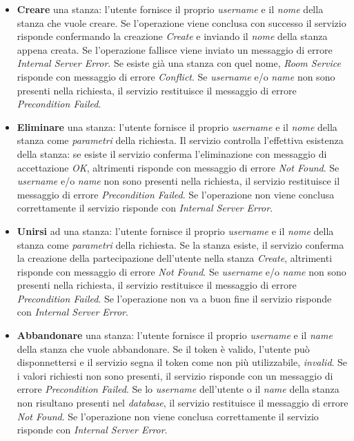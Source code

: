 \begin{itemize}
%
    \item \textbf{Creare} una stanza: l'utente fornisce il proprio \textit{username} e il \textit{nome} della stanza che vuole creare. Se l'operazione viene conclusa con successo il servizio risponde confermando la creazione \textit{Create} e inviando il \textit{nome} della stanza appena creata. Se l'operazione fallisce viene inviato un messaggio di errore \textit{Internal Server Error}. Se esiste già una stanza con quel nome, \textit{Room Service} risponde con messaggio di errore \textit{Conflict}.  Se \textit{username} e/o \textit{name} non sono presenti nella richiesta, il servizio restituisce il messaggio di errore \textit{Precondition Failed}.
%
    \item \textbf{Eliminare} una stanza: l'utente fornisce il proprio \textit{username} e il \textit{nome} della stanza come \textit{parametri} della richiesta. Il servizio controlla l'effettiva esistenza della stanza: se esiste il servizio conferma l'eliminazione con messaggio di accettazione \textit{OK}, altrimenti risponde con messaggio di errore \textit{Not Found}.  Se \textit{username} e/o \textit{name} non sono presenti nella richiesta, il servizio restituisce il messaggio di errore \textit{Precondition Failed}. Se l'operazione non viene conclusa correttamente il servizio risponde con \textit{Internal Server Error}.
%
    \item \textbf{Unirsi} ad una stanza: l'utente fornisce il proprio \textit{username} e il \textit{nome} della stanza come \textit{parametri} della richiesta. Se la stanza esiste, il servizio conferma la creazione della partecipazione dell'utente nella stanza \textit{Create}, altrimenti risponde con messaggio di errore \textit{Not Found}. Se \textit{username} e/o \textit{name} non sono presenti nella richiesta, il servizio restituisce il messaggio di errore \textit{Precondition Failed}. Se l'operazione non va a buon fine il servizio risponde con \textit{Internal Server Error}.
%
    \item \textbf{Abbandonare} una stanza: l'utente fornisce il proprio \textit{username} e il \textit{name} della stanza che vuole abbandonare. Se il token è valido, l'utente può disponnettersi e il servizio segna il token come non più utilizzabile, \textit{invalid}. Se i valori richiesti non sono presenti, il servizio risponde con un messaggio di errore \textit{Precondition Failed}. Se lo \textit{username} dell'utente o il \textit{name} della stanza non risultano presenti nel \textit{database}, il servizio restituisce il messaggio di errore \textit{Not Found}. Se l'operazione non viene conclusa correttamente il servizio risponde con \textit{Internal Server Error}.

\end{itemize}
